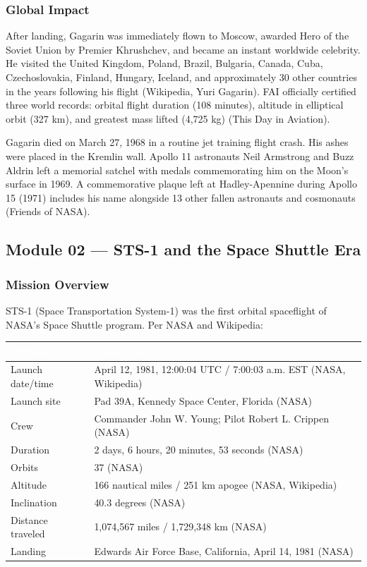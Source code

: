 \documentclass[11pt,letterpaper]{article}
\newcommand{\tableheader}[1]{\textbf{\sffamily\textcolor{white}{#1}}}
\begin{document}
\subsubsection{Global Impact}

After landing, Gagarin was immediately flown to Moscow, awarded Hero of the Soviet Union by Premier Khrushchev, and became an instant worldwide celebrity. He visited the United Kingdom, Poland, Brazil, Bulgaria, Canada, Cuba, Czechoslovakia, Finland, Hungary, Iceland, and approximately 30 other countries in the years following his flight (Wikipedia, Yuri Gagarin). FAI officially certified three world records: orbital flight duration (108 minutes), altitude in elliptical orbit (327 km), and greatest mass lifted (4,725 kg) (This Day in Aviation).

Gagarin died on March 27, 1968 in a routine jet training flight crash. His ashes were placed in the Kremlin wall. Apollo 11 astronauts Neil Armstrong and Buzz Aldrin left a memorial satchel with medals commemorating him on the Moon's surface in 1969. A commemorative plaque left at Hadley-Apennine during Apollo 15 (1971) includes his name alongside 13 other fallen astronauts and cosmonauts (Friends of NASA).

\subsection{Module 02 — STS-1 and the Space Shuttle Era}

\subsubsection{Mission Overview}

STS-1 (Space Transportation System-1) was the first orbital spaceflight of NASA's Space Shuttle program. Per NASA and Wikipedia:

\begin{center}
\begin{tabularx}{\textwidth}{L{4cm}X}
\toprule
{}
\tableheader{Parameter} & \tableheader{Value (Source)} \\
\midrule
Launch date/time & April 12, 1981, 12:00:04 UTC / 7:00:03 a.m. EST (NASA, Wikipedia) \\
Launch site & Pad 39A, Kennedy Space Center, Florida (NASA) \\
Crew & Commander John W. Young; Pilot Robert L. Crippen (NASA) \\
Duration & 2 days, 6 hours, 20 minutes, 53 seconds (NASA) \\
Orbits & 37 (NASA) \\
Altitude & 166 nautical miles / 251 km apogee (NASA, Wikipedia) \\
Inclination & 40.3 degrees (NASA) \\
Distance traveled & 1,074,567 miles / 1,729,348 km (NASA) \\
Landing & Edwards Air Force Base, California, April 14, 1981 (NASA) \\
\bottomrule
\end{tabularx}
\end{center}
\end{document}

